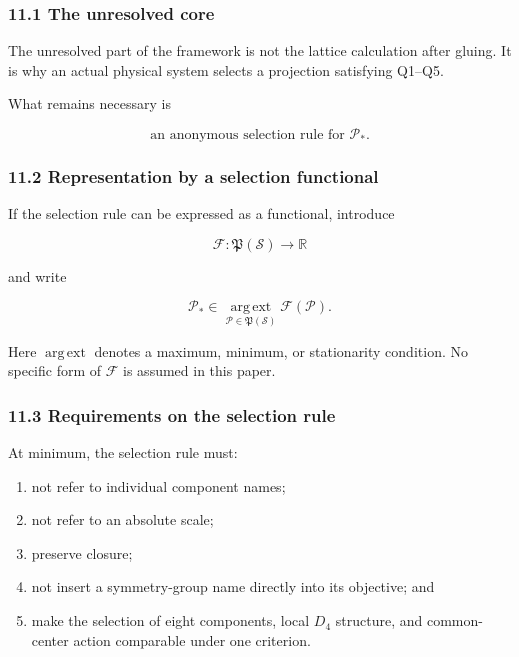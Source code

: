 \documentclass[
  a4paper,
]{article}
\providecommand{\tightlist}{%
  \setlength{\itemsep}{0pt}\setlength{\parskip}{0pt}}
\begin{document}
\subsubsection{11.1 The unresolved core}\label{the-unresolved-core}

The unresolved part of the framework is not the lattice calculation
after gluing. It is why an actual physical system selects a projection
satisfying Q1--Q5.

What remains necessary is

\[
\boxed{
\text{an anonymous selection rule for }\mathcal P_*.
}
\]

\subsubsection{11.2 Representation by a selection
functional}\label{representation-by-a-selection-functional}

If the selection rule can be expressed as a functional, introduce

\[
\mathcal F:
\mathfrak P(\mathscr S)
\longrightarrow
\mathbb R
\]

and write

\[
\mathcal P_*
\in
\operatorname*{arg\,ext}_{\mathcal P\in\mathfrak P(\mathscr S)}
\mathcal F(\mathcal P).
\]

Here \(\operatorname*{arg\,ext}\) denotes a maximum, minimum, or
stationarity condition. No specific form of \(\mathcal F\) is assumed in
this paper.

\subsubsection{11.3 Requirements on the selection
rule}\label{requirements-on-the-selection-rule}

At minimum, the selection rule must:

\begin{enumerate}
\def\labelenumi{\arabic{enumi}.}
\tightlist
\item
  not refer to individual component names;
\item
  not refer to an absolute scale;
\item
  preserve closure;
\item
  not insert a symmetry-group name directly into its objective; and
\item
  make the selection of eight components, local \(D_4\) structure, and
  common-center action comparable under one criterion.
\end{enumerate}
\end{document}
